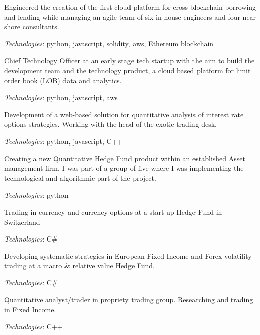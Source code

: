 Engineered the creation of the first cloud platform for cross blockchain borrowing and lending
while managing an agile team of six in house engineers and four near shore consultants.

{\it Technologies}: python, javascript, solidity, aws, Ethereum blockchain



Chief Technology Officer at an early stage tech startup with the aim to build the development team and the technology product,
a cloud based platform for limit order book (LOB) data and analytics.

{\it Technologies}: python, javascript, aws


Development of a web-based solution for quantitative analysis of interest rate options strategies.
Working with the head of the exotic trading desk.

{\it Technologies}: python, javascript, C++


Creating a new Quantitative Hedge Fund product within an established Asset management firm.
I was part of a group of five where I was implementing the technological and algorithmic part of the project.

{\it Technologies}: python


Trading in currency and currency options at a start-up Hedge Fund in Switzerland

{\it Technologies}: C\#


Developing systematic strategies in European Fixed Income and Forex volatility trading at a macro \& relative value Hedge Fund.

{\it Technologies}: C\#


Quantitative analyst/trader in propriety trading group. Researching and trading in Fixed Income.

{\it Technologies}: C++
